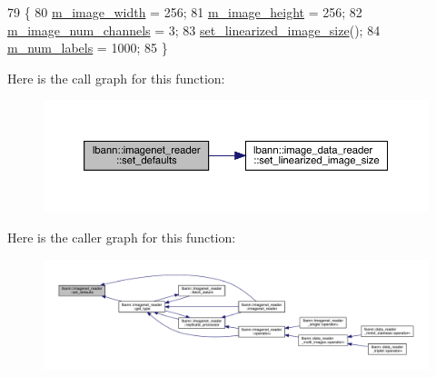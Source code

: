 \begin{DoxyCode}
79                                    \{
80   \hyperlink{classlbann_1_1image__data__reader_af001f3d1c0f1c580b66988233b3a64f0}{m\_image\_width} = 256;
81   \hyperlink{classlbann_1_1image__data__reader_a0632efa3deaa9d61e671f741909eb3fe}{m\_image\_height} = 256;
82   \hyperlink{classlbann_1_1image__data__reader_aab1a440f361521dc7bd583cefe1061f8}{m\_image\_num\_channels} = 3;
83   \hyperlink{classlbann_1_1image__data__reader_a0164b0e3abbe92daef73b36fb925403e}{set\_linearized\_image\_size}();
84   \hyperlink{classlbann_1_1image__data__reader_af280e8758a6ec3acee7c62e6351d17e0}{m\_num\_labels} = 1000;
85 \}
\end{DoxyCode}
Here is the call graph for this function\+:\nopagebreak
\begin{figure}[H]
\begin{center}
\leavevmode
\includegraphics[width=350pt]{classlbann_1_1imagenet__reader_ad1e108315d659509a3e166c2f8a4941f_cgraph}
\end{center}
\end{figure}
Here is the caller graph for this function\+:\nopagebreak
\begin{figure}[H]
\begin{center}
\leavevmode
\includegraphics[width=350pt]{classlbann_1_1imagenet__reader_ad1e108315d659509a3e166c2f8a4941f_icgraph}
\end{center}
\end{figure}
\mbox{\label{classlbann_1_1imagenet__reader_a17af38eff1c3aee001d263248b8406a1}} 
